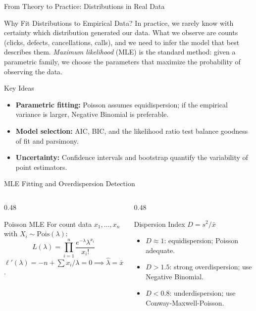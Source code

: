 \documentclass[aspectratio=169,xcolor={dvipsnames,table}]{beamer}
\begin{document}
\begin{frame}{From Theory to Practice: Distributions in Real Data}
	\vspace{-0.15cm}
	\begin{block}{Why Fit Distributions to Empirical Data?}
		\footnotesize
		In practice, we rarely know with certainty which distribution generated our data. What we observe are counts (clicks, defects, cancellations, calls), and we need to infer the model that best describes them. \emph{Maximum likelihood} (MLE) is the standard method: given a parametric family, we choose the parameters that maximize the probability of observing the data.
	\end{block}
	\vspace{-0.1cm}
	\pause
	\begin{alertblock}{Key Ideas}
		\footnotesize
		\begin{itemize}\itemsep=0.06cm
			\item \textbf{Parametric fitting:} Poisson assumes equidispersion; if the empirical variance is larger, Negative Binomial is preferable.
			\item \textbf{Model selection:} AIC, BIC, and the likelihood ratio test balance goodness of fit and parsimony.
			\item \textbf{Uncertainty:} Confidence intervals and bootstrap quantify the variability of point estimators.
		\end{itemize}
	\end{alertblock}
\end{frame}

\begin{frame}{MLE Fitting and Overdispersion Detection}
	\vspace{-0.15cm}
	\begin{columns}[T]
		\begin{column}{0.48\textwidth}
			\begin{block}{Poisson MLE}
				\footnotesize
				For count data $x_1, \dots, x_n$ with $X_i \sim \text{Pois}(\lambda)$:
				$$L(\lambda) = \prod_{i=1}^{n} \dfrac{e^{-\lambda}\lambda^{x_i}}{x_i!}$$
				$\ell'(\lambda) = -n + \sum x_i / \lambda = 0 \implies \hat{\lambda} = \bar{x}$.
			\end{block}
		\end{column}
		\begin{column}{0.48\textwidth}
			\begin{alertblock}{Dispersion Index $D = s^2/\bar{x}$}
				\footnotesize
				\begin{itemize}\itemsep=0.04cm
					\item $D \approx 1$: equidispersion; Poisson adequate.
					\item $D > 1.5$: strong overdispersion; use Negative Binomial.
					\item $D < 0.8$: underdispersion; use Conway-Maxwell-Poisson.
				\end{itemize}
			\end{alertblock}
		\end{column}
	\end{columns}
\end{frame}
\end{document}
